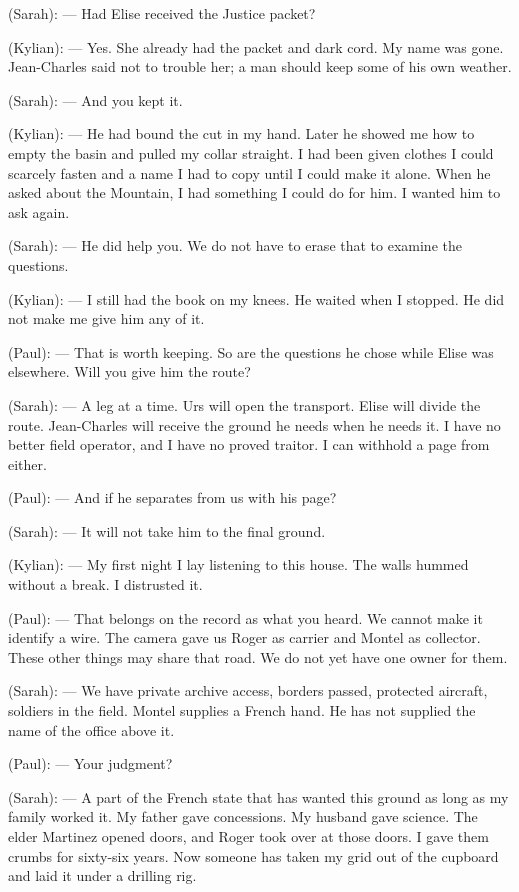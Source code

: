 \begin{room}
(Sarah): --- Had Elise received the Justice packet?

(Kylian): --- Yes. She already had the packet and dark cord. My name was gone. Jean-Charles said not to trouble her; a man should keep some of his own weather.

(Sarah): --- And you kept it.

(Kylian): --- He had bound the cut in my hand. Later he showed me how to empty the basin and pulled my collar straight. I had been given clothes I could scarcely fasten and a name I had to copy until I could make it alone. When he asked about the Mountain, I had something I could do for him. I wanted him to ask again.

(Sarah): --- He did help you. We do not have to erase that to examine the questions.

(Kylian): --- I still had the book on my knees. He waited when I stopped. He did not make me give him any of it.

(Paul): --- That is worth keeping. So are the questions he chose while Elise was elsewhere. Will you give him the route?

(Sarah): --- A leg at a time. Urs will open the transport. Elise will divide the route. Jean-Charles will receive the ground he needs when he needs it. I have no better field operator, and I have no proved traitor. I can withhold a page from either.

(Paul): --- And if he separates from us with his page?

(Sarah): --- It will not take him to the final ground.

(Kylian): --- My first night I lay listening to this house. The walls hummed without a break. I distrusted it.

(Paul): --- That belongs on the record as what you heard. We cannot make it identify a wire. The camera gave us Roger as carrier and Montel as collector. These other things may share that road. We do not yet have one owner for them.

(Sarah): --- We have private archive access, borders passed, protected aircraft, soldiers in the field. Montel supplies a French hand. He has not supplied the name of the office above it.

(Paul): --- Your judgment?

(Sarah): --- A part of the French state that has wanted this ground as long as my family worked it. My father gave concessions. My husband gave science. The elder Martinez opened doors, and Roger took over at those doors. I gave them crumbs for sixty-six years. Now someone has taken my grid out of the cupboard and laid it under a drilling rig.


\end{room}
